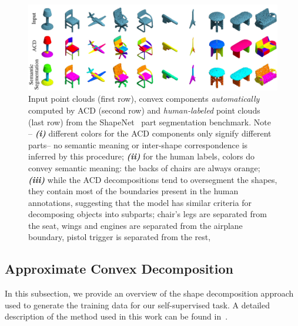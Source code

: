 \begin{figure}[t]
    \centering
    \includegraphics[width=\linewidth]{acd/imgs/acdexamples.pdf}
    \caption{ \small{
    Input point clouds (first row), convex components \emph{automatically} computed by ACD (second row) and
    \emph{human-labeled} point clouds (last row) from the ShapeNet~\cite{Chang2015ShapeNetAI} part segmentation benchmark.
    Note -- \textit{\textbf{(i)}} different colors for the ACD components only signify different parts-- no semantic
    meaning or inter-shape correspondence is inferred by this procedure; 
    \textit{\textbf{(ii)}} for the human labels, colors do convey semantic meaning: \eg the backs of chairs are always orange;
    \textit{\textbf{(iii)}} while the ACD decompositions tend to oversegment the shapes, they contain 
    most of the boundaries present in the human annotations, 
    suggesting that the model has similar criteria for decomposing objects into subparts;
    \eg chair's legs are separated from the seat,
    wings and engines are separated from the airplane boundary, pistol trigger is separated from the rest, \etc~
    }}
    \label{fig:samples-of-acds}
\end{figure}



\subsection{Approximate Convex Decomposition}
\label{sec:acd}
In this subsection, we provide an overview of the shape decomposition approach used to 
generate the training data for our self-supervised task.
A detailed description of the method used in this work can be found in~\cite{vhacd}.


